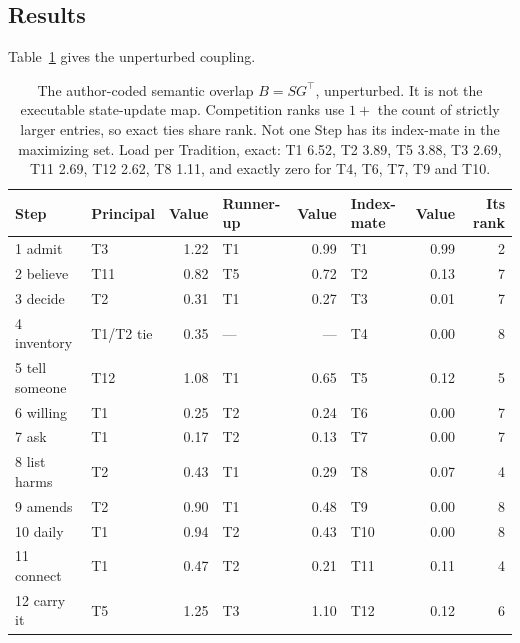\documentclass[11pt,a4paper]{article}
\begin{document}
\subsection{Results}

Table~\ref{tab:coupling} gives the unperturbed coupling.

\begin{table}[htbp]\centering\small
\begin{tabular}{@{}llrlrlrr@{}}
\toprule
Step & Principal & Value & Runner-up & Value & Index-mate & Value & Its rank \\
\midrule
1 admit        & T3  & 1.22 & T1 & 0.99 & T1  & 0.99 & 2 \\
2 believe      & T11 & 0.82 & T5 & 0.72 & T2  & 0.13 & 7 \\
3 decide       & T2  & 0.31 & T1 & 0.27 & T3  & 0.01 & 7 \\
4 inventory    & T1/T2 tie & 0.35 & --- & --- & T4  & 0.00 & 8 \\
5 tell someone & T12 & 1.08 & T1 & 0.65 & T5  & 0.12 & 5 \\
6 willing      & T1  & 0.25 & T2 & 0.24 & T6  & 0.00 & 7 \\
7 ask          & T1  & 0.17 & T2 & 0.13 & T7  & 0.00 & 7 \\
8 list harms   & T2  & 0.43 & T1 & 0.29 & T8  & 0.07 & 4 \\
9 amends       & T2  & 0.90 & T1 & 0.48 & T9  & 0.00 & 8 \\
10 daily       & T1  & 0.94 & T2 & 0.43 & T10 & 0.00 & 8 \\
11 connect     & T1  & 0.47 & T2 & 0.21 & T11 & 0.11 & 4 \\
12 carry it    & T5  & 1.25 & T3 & 1.10 & T12 & 0.12 & 6 \\
\bottomrule
\end{tabular}
\caption{The author-coded semantic overlap $B = SG^{\top}$, unperturbed. It is not
the executable state-update map. Competition ranks use $1+$ the count of strictly
larger entries, so exact ties share rank. Not one Step has its index-mate in the
maximizing set. Load per Tradition, exact: T1 6.52, T2 3.89,
T5 3.88, T3 2.69, T11 2.69, T12 2.62, T8 1.11, and exactly zero for T4, T6, T7,
T9 and T10.}
\label{tab:coupling}
\end{table}
\end{document}

